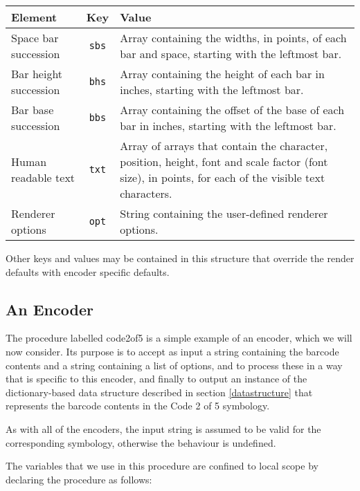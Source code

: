 \documentclass []{article}
\begin{document}
\begin{center}

\begin{tabular}{l|c|p{6.5cm}}
Element               & Key  & Value \\
\hline
Space bar succession  & \texttt{sbs}  & 
Array containing the widths, in points, of each bar and 
space, starting with the leftmost bar.\\ 

Bar height succession & \texttt{bhs}  &
Array containing the height of each bar in inches, starting with 
the leftmost bar.\\

Bar base succession   & \texttt{bbs}  &  
Array containing the offset of the base of each bar in inches,
starting with the leftmost bar.\\

Human readable text   & \texttt{txt}  &
Array of arrays that contain the character, position, height,
font and scale factor (font size), in points, for each of the visible 
text characters.\\

Renderer options      & \texttt{opt}  &
String containing the user-defined renderer options.
\end{tabular}

\end{center}

Other keys and values may be contained in this structure that override
the render defaults with encoder specific defaults.

\subsection{An Encoder}

The procedure labelled code2of5 is a simple example of an encoder,
which we will now consider. Its purpose is to accept as input a string
containing the barcode contents and a string containing a list of options, 
and to process these in a way
that is specific to this encoder, and finally to output an
instance of the dictionary-based data structure described in section
\ref{datastructure} that represents the barcode contents in the 
Code 2 of 5 symbology.

As with all of the encoders, the input string is assumed to be valid for
the corresponding symbology, otherwise the behaviour is undefined.

The variables that we use in this procedure are confined to local
scope by declaring the procedure as follows:
\end{document}
